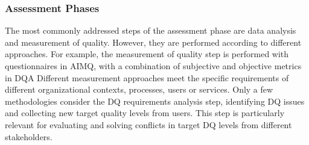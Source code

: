 \documentclass[pdftex,english,oribibl]{llncs}
\begin{document}
\subsubsection{Assessment Phases}
The most commonly addressed steps of the assessment phase are data analysis and measurement of quality. However, they are performed according to different approaches.
For example, the measurement of quality step is performed with questionnaires in AIMQ, with a combination of subjective and objective metrics in DQA
Different measurement approaches meet the specific requirements of different organizational contexts, processes, users or services. Only a few methodologies consider the DQ requirements analysis step, identifying DQ issues and collecting new target quality levels from users. This step is particularly relevant for evaluating and solving conflicts in target DQ levels from different stakeholders.
\end{document}
